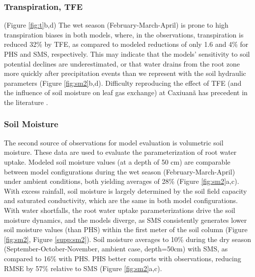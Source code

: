 \documentclass[draft,linenumbers]{agujournal}
\begin{document}
\subsubsection{Transpiration, TFE}
\label{sect:ttfe}
 (Figure \ref{fig:t}b,d) 
The wet season (February-March-April) is prone to high transpiration biases in both models, where, in the observations, transpiration is reduced 32\% by TFE, as compared to modeled reductions of only 1.6 and 4\% for PHS and SMS, respectively.
This may indicate that the models' sensitivity to soil potential declines are underestimated, or that water drains from the root zone more quickly after precipitation events than we represent with the soil hydraulic parameters (Figure \ref{fig:sm2}b,d).
Difficulty reproducing the effect of TFE (and the influence of soil moisture on leaf gas exchange) at Caxiuan\~a has precedent in the literature \citep{restrepo2017,powell2013}.

\subsubsection{Soil Moisture}
\label{results:sm}
The second source of observations for model evaluation is volumetric soil moisture. 
These data are used to evaluate the parameterization of root water uptake.
Modeled soil moisture values (at a depth of 50 cm) are comparable between model configurations during the wet season (February-March-April) under ambient conditions, both yielding averages of 28\% (Figure \ref{fig:sm2}a,c).
With excess rainfall, soil moisture is largely determined by the soil field capacity and saturated conductivity, which are the same in both model configurations.
With water shortfalls, the root water uptake parameterizations drive the soil moisture dynamics, and the models diverge, 
as SMS consistently generates lower soil moisture values (than PHS) within the first meter of the soil column (Figure \ref{fig:sm2}, Figure \ref{supp:sm2}).
Soil moisture averages to 10\% during the dry season (September-October-November, ambient case, depth=50cm) with SMS, as compared to 16\% with PHS.
PHS better comports with observations, reducing RMSE by 57\% relative to SMS (Figure \ref{fig:sm2}a,c).
\end{document}
